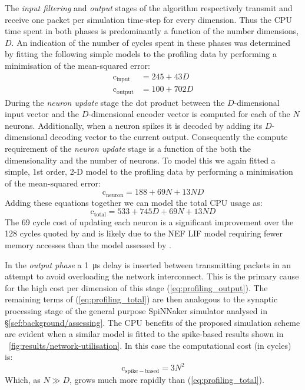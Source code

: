 \documentclass[conference]{IEEEtran}
\begin{document}
The \textit{input filtering} and \textit{output} stages of the algorithm respectively transmit and receive one packet per simulation time-step for every dimension.
Thus the CPU time spent in both phases is predominantly a function of the number dimensions, $D$.
An indication of the number of cycles spent in these phases was determined by fitting the following simple models to the profiling data by performing a minimisation of the mean-squared error:
%
\begin{align}
  \mathrm{c}_\mathrm{input} & = 245 + 43 D \label{eq:profiling_input}\\
  \mathrm{c}_\mathrm{output} & = 100 + 702 D \label{eq:profiling_output}
\end{align}
%
During the \textit{neuron update} stage the dot product between the $D$-dimensional input vector and the $D$-dimensional encoder vector is computed for each of the $N$ neurons.
Additionally, when a neuron spikes it is decoded by adding its $D$-dimensional decoding vector to the current output.
Consequently the compute requirement of the \textit{neuron update} stage is a function of the both the dimensionality and the number of neurons.
To model this we again fitted a simple, 1st order, 2-D model to the profiling data by performing a minimisation of the mean-squared error:
%
\begin{equation}
  \mathrm{c}_\mathrm{neuron} = 188 + 69 N + 13 N D\label{eq:profiling_neuron}
\end{equation}
%
Adding these equations together we can model the total CPU usage as:
%
\begin{equation}
  \mathrm{c}_\mathrm{total} = 533 + 745 D + 69 N + 13 N D\label{eq:profiling_total}
\end{equation}
%
The 69 cycle cost of updating each neuron is a significant improvement over the 128 cycles quoted by \textcite{Sharp2013} and is likely due to the NEF LIF model requiring fewer memory accesses than the model assessed by \citeauthor{Sharp2013}.

In the \textit{output phase} a \SI{1}{\micro\second} delay is inserted between transmitting packets in an attempt to avoid overloading the network interconnect.
This is the primary cause for the high cost per dimension of this stage (\ref{eq:profiling_output}).
The remaining terms of (\ref{eq:profiling_total}) are then analogous to the synaptic processing stage of the general purpose SpiNNaker simulator analysed in \S\ref{sef:background/assessing}.
The CPU benefits of the proposed simulation scheme are evident when a similar model is fitted to the spike-based results shown in \figurename~\ref{fig:results/network-utilisation}.
In this case the computational cost (in cycles) is:
%
\begin{equation}
  \mathrm{c}_\mathrm{spike-based} = 3 N^{2}
\end{equation}
%
Which, as $N \gg D$, grows much more rapidly than (\ref{eq:profiling_total}).
\end{document}
